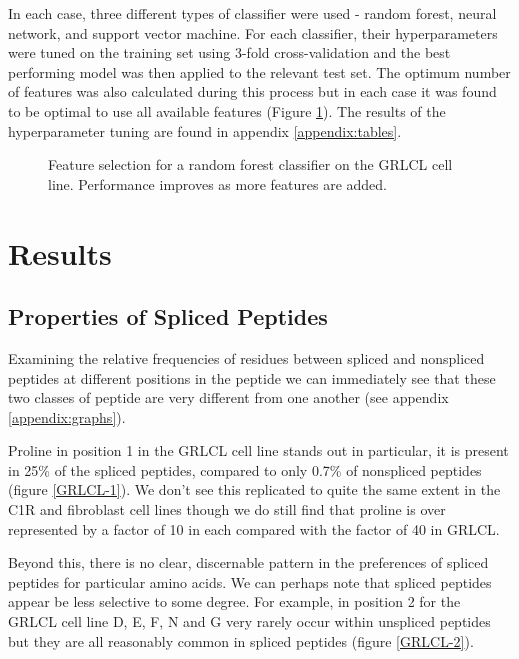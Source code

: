 \documentclass[10pt,a4paper,twoside,twocolumn]{article}
\begin{document}
In each case, three different types of classifier were used - random forest, neural network, and support vector machine. For each classifier, their hyperparameters were tuned on the training set using 3-fold cross-validation and the best performing model was then applied to the relevant test set. The optimum number of features was also calculated during this process but in each case it was found to be optimal to use all available features (Figure \ref{feature-selection}). The results of the hyperparameter tuning are found in appendix \ref{appendix:tables}. 


\begin{figure}
			\newlength\figureheight
			\newlength\figurewidth
	\setlength\figureheight{6cm}
	\setlength{}
	
	\caption{Feature selection for a random forest classifier on the GRLCL cell line. Performance improves as more features are added.}
	\label{feature-selection}
\end{figure}



\section*{Results}
\subsection*{Properties of Spliced Peptides}

Examining the relative frequencies of residues between spliced and nonspliced peptides at different positions in the peptide we can immediately see that these two classes of peptide are very different from one another (see appendix \ref{appendix:graphs}).

Proline in position 1 in the GRLCL cell line stands out in particular, it is present in 25\% of the spliced peptides, compared to only 0.7\% of nonspliced peptides (figure \ref{GRLCL-1}). We don't see this replicated to quite the same extent in the C1R and fibroblast cell lines though we do still find that proline is over represented by a factor of 10 in each compared with the factor of 40 in GRLCL.

Beyond this, there is no clear, discernable pattern in the preferences of spliced peptides for particular amino acids. We can perhaps note that spliced peptides appear be less selective to some degree. For example, in position 2 for the GRLCL cell line D, E, F, N and G very rarely occur within unspliced peptides but they are all reasonably common in spliced peptides (figure \ref{GRLCL-2}).
\end{document}
